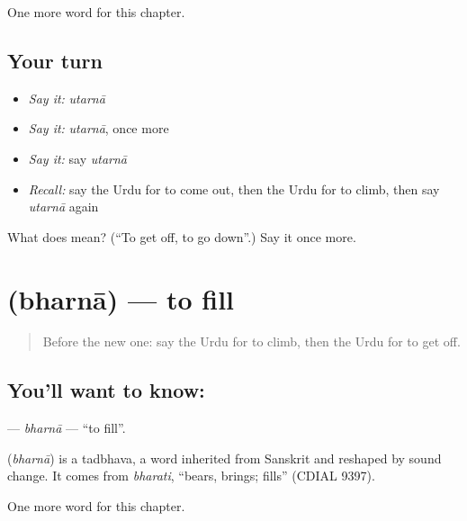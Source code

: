 \begin{grammarlens}[title={What you've built}]
One more word for this chapter.
\end{grammarlens}

\subsection*{Your turn}
\begin{itemize}
\raggedright
  \item \emph{Say it:} \emph{utarnā}
  \item \emph{Say it:} \emph{utarnā}, once more
  \item \emph{Say it:} say \emph{utarnā}
  \item \emph{Recall:} say the Urdu for to come out, then the Urdu for to climb, then say \emph{utarnā} again
\end{itemize}

\begin{tcolorbox}[breakable,colback=teal!4,colframe=teal!35!black,title={Before you move on}]
What does  mean? (\textquotedblleft{}To get off, to go down\textquotedblright{}.) Say it once more.
\end{tcolorbox}
\section[\texorpdfstring{\ur{بھرنا} (bharnā)}{بھرنا (bharnā)}]{ (bharnā) — to fill}

\label{lesson:UR-C142-bharna}



\begin{quote}
Before the new one: say the Urdu for to climb, then the Urdu for to get off.
\end{quote}

\subsection*{You'll want to know: }
\textbf{} — \emph{bharnā} — \textquotedblleft{}to fill\textquotedblright{}.

\begin{cousinweb}
\textbf{} (\emph{bharnā}) is a tadbhava, a word inherited from Sanskrit and reshaped by sound change. It comes from \emph{bharati}, \textquotedblleft{}bears, brings; fills\textquotedblright{} (CDIAL 9397).
\end{cousinweb}

\begin{grammarlens}[title={What you've built}]
One more word for this chapter.
\end{grammarlens}

